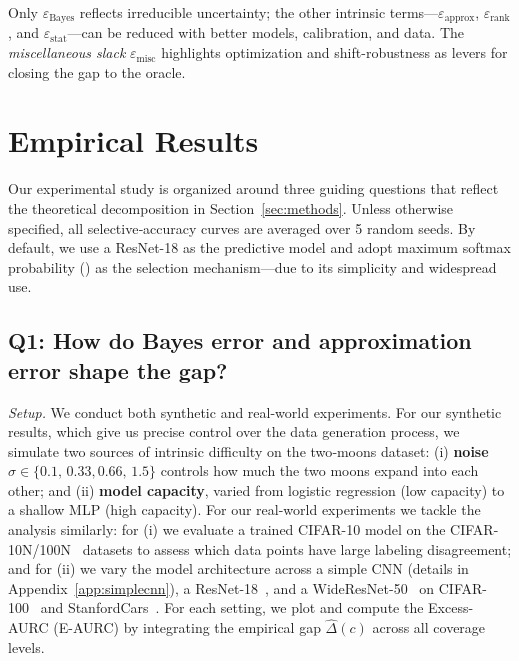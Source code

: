 \begin{takeaway}
Only \(\varepsilon_{\text{Bayes}}\) reflects irreducible uncertainty; the other intrinsic terms—\(\varepsilon_{\text{approx}}\), \(\varepsilon_{\text{rank}}\), and \(\varepsilon_{\text{stat}}\)—can be reduced with better models, calibration, and data. The \emph{miscellaneous slack} \(\varepsilon_{\text{misc}}\) highlights optimization and shift-robustness as levers for closing the gap to the oracle.
\end{takeaway}


\section{Empirical Results}
\label{sec:experiments}

Our experimental study is organized around three guiding questions that reflect the theoretical decomposition in Section~\ref{sec:methods}. Unless otherwise specified, all selective‑accuracy curves are averaged over 5 random seeds. By default, we use a ResNet-18 as the predictive model and adopt maximum softmax probability (\msp) as the selection mechanism---due to its simplicity and widespread use.

\subsection{Q1: How do Bayes error and approximation error shape the gap?}

\emph{Setup.}  
We conduct both synthetic and real-world experiments. For our synthetic results, which give us precise control over the data generation process, we simulate two sources of intrinsic difficulty on the two‑moons dataset:
(i) \textbf{noise $\sigma \in \{0.1,\,0.33,0.66,\,1.5\}$} controls how much the two moons expand into each other; and
(ii) \textbf{model capacity}, varied from logistic regression
(low capacity) to a shallow MLP (high capacity). For our real-world experiments we tackle the analysis similarly: for (i) we evaluate a trained CIFAR-10 model on the CIFAR-10N/100N~\citep{wei2021learning} datasets to assess which data points have large labeling disagreement; and for (ii) we vary the model architecture across a simple CNN (details in Appendix~\ref{app:simplecnn}), a ResNet-18~\citep{he2016deep}, and a WideResNet-50~\citep{zagoruyko2016wide} on CIFAR-100~\citep{krizhevsky2009learning} and StanfordCars~\citep{krause20133d}. For each setting, we plot and compute the Excess-AURC (E-AURC) \citep{geifman2018bias} by integrating the empirical gap $\widehat{\Delta}(c)$ across all coverage levels.

